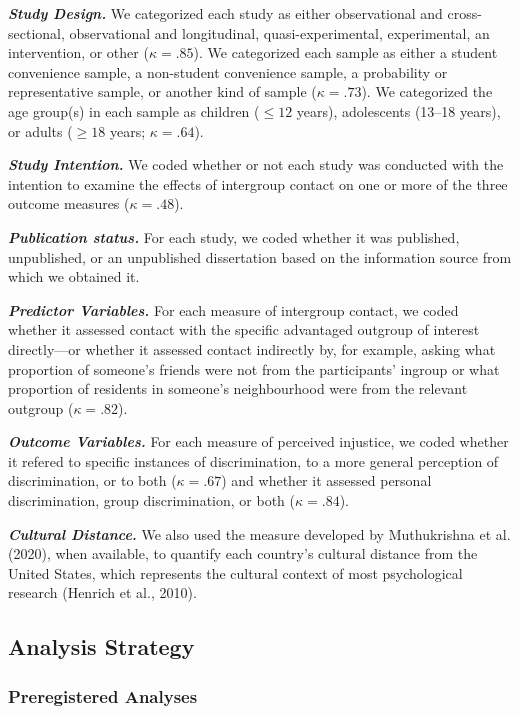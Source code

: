 \documentclass[12pt, letterpaper]{article}
\begin{document}
\textbf{\emph{Study Design.}} We categorized each study as either
observational and cross-sectional, observational and longitudinal,
quasi-experimental, experimental, an intervention, or other
(\(\kappa = .85\)). We categorized each sample as either a student
convenience sample, a non-student convenience sample, a probability or
representative sample, or another kind of sample (\(\kappa = .73\)). We
categorized the age group(s) in each sample as children (\(\leq 12\)
years), adolescents (13--18 years), or adults (\(\geq 18\) years;
\(\kappa = .64\)).

\textbf{\emph{Study Intention.}} We coded whether or not each study was
conducted with the intention to examine the effects of intergroup
contact on one or more of the three outcome measures (\(\kappa = .48\)).

\textbf{\emph{Publication status.}} For each study, we coded whether it
was published, unpublished, or an unpublished dissertation based on the
information source from which we obtained it.

\textbf{\emph{Predictor Variables.}} For each measure of intergroup
contact, we coded whether it assessed contact with the specific
advantaged outgroup of interest directly---or whether it assessed
contact indirectly by, for example, asking what proportion of someone's
friends were not from the participants' ingroup or what proportion of
residents in someone's neighbourhood were from the relevant outgroup
(\(\kappa = .82\)).

\textbf{\emph{Outcome Variables.}} For each measure of perceived
injustice, we coded whether it refered to specific instances of
discrimination, to a more general perception of discrimination, or to
both (\(\kappa = .67\)) and whether it assessed personal discrimination,
group discrimination, or both (\(\kappa = .84\)).

\textbf{\emph{Cultural Distance.}} We also used the measure developed by
Muthukrishna et al. (2020), when available, to quantify each country's
cultural distance from the United States, which represents the cultural
context of most psychological research (Henrich et al., 2010).

\hypertarget{analysis-strategy}{%
\subsection{Analysis Strategy}\label{analysis-strategy}}

\hypertarget{preregistered-analyses}{%
\subsubsection{Preregistered Analyses}\label{preregistered-analyses}}
\end{document}

